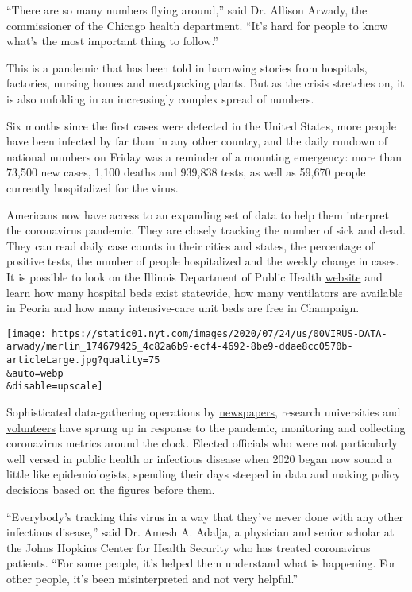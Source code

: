 ``There are so many numbers flying around,'' said Dr. Allison Arwady,
the commissioner of the Chicago health department. ``It's hard for
people to know what's the most important thing to follow.''

This is a pandemic that has been told in harrowing stories from
hospitals, factories, nursing homes and meatpacking plants. But as the
crisis stretches on, it is also unfolding in an increasingly complex
spread of numbers.

Six months since the first cases were detected in the United States,
more people have been infected by far than in any other country, and the
daily rundown of national numbers on Friday was a reminder of a mounting
emergency: more than 73,500 new cases, 1,100 deaths and 939,838 tests,
as well as 59,670 people currently hospitalized for the virus.

Americans now have access to an expanding set of data to help them
interpret the coronavirus pandemic. They are closely tracking the number
of sick and dead. They can read daily case counts in their cities and
states, the percentage of positive tests, the number of people
hospitalized and the weekly change in cases. It is possible to look on
the Illinois Department of Public Health
\href{http://www.dph.illinois.gov/covid19/hospitalization-utilization}{website}
and learn how many hospital beds exist statewide, how many ventilators
are available in Peoria and how many intensive-care unit beds are free
in Champaign.

\texttt{[image: https://static01.nyt.com/images/2020/07/24/us/00VIRUS-DATA-arwady/merlin\_174679425\_4c82a6b9-ecf4-4692-8be9-ddae8cc0570b-articleLarge.jpg?quality=75\\\&auto=webp\\\&disable=upscale]}

Sophisticated data-gathering operations by
\href{https://www.nytimes.com/interactive/2020/us/coronavirus-us-cases.html}{newspapers},
research universities and \href{https://covidtracking.com/}{volunteers}
have sprung up in response to the pandemic, monitoring and collecting
coronavirus metrics around the clock. Elected officials who were not
particularly well versed in public health or infectious disease when
2020 began now sound a little like epidemiologists, spending their days
steeped in data and making policy decisions based on the figures before
them.

``Everybody's tracking this virus in a way that they've never done with
any other infectious disease,'' said Dr. Amesh A. Adalja, a physician
and senior scholar at the Johns Hopkins Center for Health Security who
has treated coronavirus patients. ``For some people, it's helped them
understand what is happening. For other people, it's been misinterpreted
and not very helpful.''

